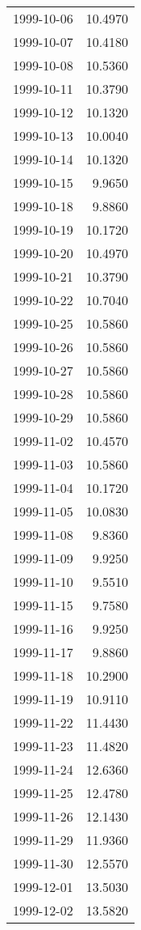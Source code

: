 \begin{tabular}{lr}
1999-10-06 &     10.4970 \\
1999-10-07 &     10.4180 \\
1999-10-08 &     10.5360 \\
1999-10-11 &     10.3790 \\
1999-10-12 &     10.1320 \\
1999-10-13 &     10.0040 \\
1999-10-14 &     10.1320 \\
1999-10-15 &      9.9650 \\
1999-10-18 &      9.8860 \\
1999-10-19 &     10.1720 \\
1999-10-20 &     10.4970 \\
1999-10-21 &     10.3790 \\
1999-10-22 &     10.7040 \\
1999-10-25 &     10.5860 \\
1999-10-26 &     10.5860 \\
1999-10-27 &     10.5860 \\
1999-10-28 &     10.5860 \\
1999-10-29 &     10.5860 \\
1999-11-02 &     10.4570 \\
1999-11-03 &     10.5860 \\
1999-11-04 &     10.1720 \\
1999-11-05 &     10.0830 \\
1999-11-08 &      9.8360 \\
1999-11-09 &      9.9250 \\
1999-11-10 &      9.5510 \\
1999-11-15 &      9.7580 \\
1999-11-16 &      9.9250 \\
1999-11-17 &      9.8860 \\
1999-11-18 &     10.2900 \\
1999-11-19 &     10.9110 \\
1999-11-22 &     11.4430 \\
1999-11-23 &     11.4820 \\
1999-11-24 &     12.6360 \\
1999-11-25 &     12.4780 \\
1999-11-26 &     12.1430 \\
1999-11-29 &     11.9360 \\
1999-11-30 &     12.5570 \\
1999-12-01 &     13.5030 \\
1999-12-02 &     13.5820 \\

\end{tabular}
